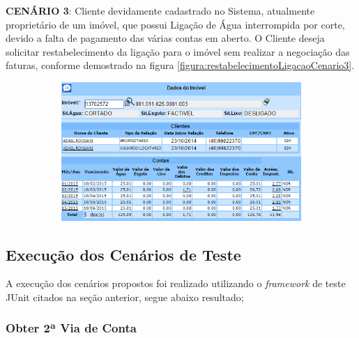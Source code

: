 \begin{flushleft}
	\begin{description}
		\item \textbf{CENÁRIO 3}: Cliente devidamente cadastrado no Sistema, atualmente proprietário de um imóvel, que possui Ligação de Água interrompida por corte, devido a falta de pagamento das várias contas em aberto. O Cliente deseja solicitar restabelecimento da ligação para o imóvel sem realizar a negociação das faturas, conforme demostrado na figura \ref{figura:restabelecimentoLigacaoCenario3}.
		\begin{figure}[H]
			\centering
			\caption{Restabelecimento da Ligação de Água - Cenário de Teste 3}
			\label{figura:restabelecimentoLigacaoCenario3}
			\begin{subfigure}[H]{\textwidth}
				\centering
				\includegraphics{figuras/cenarios/restabelecimento/cenario_3.PNG}
			\end{subfigure}
		\end{figure}
	\end{description}

\end{flushleft}	


\subsection{Execução dos Cenários de Teste}


A execução dos cenários propostos foi realizado utilizando o \textit{framework} de teste JUnit citados na seção anterior, segue abaixo resultado; 

\subsubsection{Obter 2ª Via de Conta}
 
